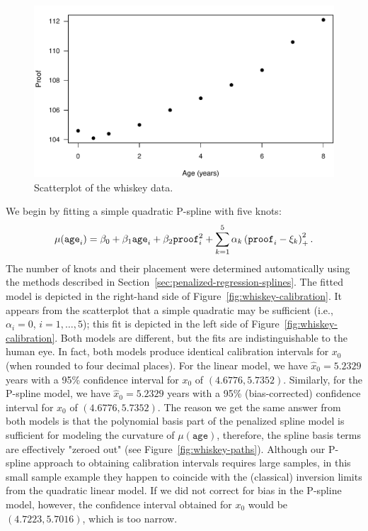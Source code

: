 \documentclass[cmfont,usenames,dvipsnames,leqno]{afit-etd}\usepackage[]{graphicx}\usepackage[]{color}
\makeatletter
\def\maxwidth{ %
  \ifdim\Gin@nat@width>\linewidth
    \linewidth
  \else
    \Gin@nat@width
  \fi
}
\newenvironment{knitrout}{}{} %
\renewenvironment{knitrout}{\begin{singlespace}}{\end{singlespace}}
\newcommand{\wh}[1]{\ensuremath{\widehat{#1}}}
\makeatother
\begin{document}
\begin{knitrout}
\color{fgcolor}\begin{figure}[H]

\includegraphics[width=\maxwidth]{figure/whiskey-scatter} \caption[Scatterplot of the whiskey data]{Scatterplot of the whiskey data.\label{fig:whiskey-scatter}}
\end{figure}


\end{knitrout}


We begin by fitting a simple quadratic P-spline with five knots:
\begin{equation*}
  \mu(\text{\texttt{age}}_i) = \beta_0 + \beta_1\text{\texttt{age}}_i + \beta_2\text{\texttt{proof}}_i^2 + \sum_{k = 1}^5\alpha_k\left( \text{\texttt{proof}}_i - \xi_k \right)_+^2.
\end{equation*}
The number of knots and their placement were determined automatically using the methods described in Section~\ref{sec:penalized-regression-splines}. The fitted model is depicted in the right-hand side of Figure~\ref{fig:whiskey-calibration}. It appears from the scatterplot that a simple quadratic may be sufficient (i.e., $\alpha_i = 0$, $i = 1, \dotsc, 5$); this fit is depicted in the left side of Figure~\ref{fig:whiskey-calibration}. Both models are different, but the fits are indistinguishable to the human eye. In fact, both models produce identical calibration intervals for $x_0$ (when rounded to four decimal places). For the linear model, we have $\wh{x}_0 = 5.2329$ years with a 95\% confidence interval for $x_0$ of $(4.6776, 5.7352)$. Similarly, for the P-spline model, we have $\wh{x}_0 = 5.2329$ years with a 95\% (bias-corrected) confidence interval for $x_0$ of $(4.6776, 5.7352)$. The reason we get the same answer from both models is that the polynomial basis part of the penalized spline model is sufficient for modeling the curvature of $\mu(\texttt{age})$, therefore, the spline basis terms are effectively "zeroed out" (see Figure~\ref{fig:whiskey-paths}). Although our P-spline approach to obtaining calibration intervals requires large samples, in this small sample example they happen to coincide with the (classical) inversion limits from the quadratic linear model. If we did not correct for bias in the P-spline model, however, the confidence interval obtained for $x_0$ would be $(4.7223, 5.7016)$, which is too narrow.
\end{document}
